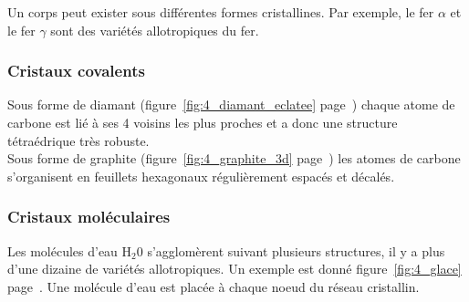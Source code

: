 \begin{rem}
    Un corps peut exister sous différentes formes cristallines. Par exemple,
    le fer $\alpha$ et le fer $\gamma$ sont des variétés allotropiques du
    fer.
\end{rem}

\subsubsection*{Cristaux covalents}
\begin{ex}[Carbone]
    Sous forme de diamant (figure~\ref{fig:4_diamant_eclatee}
    page~\pageref{fig:4_diamant_eclatee}) chaque atome de
    carbone est lié à ses 4 voisins les plus proches et a donc une
    structure tétraédrique très robuste.\\
    Sous forme de graphite (figure~\ref{fig:4_graphite_3d}
    page~\pageref{fig:4_graphite_3d}) les atomes de
    carbone s'organisent en feuillets hexagonaux régulièrement
    espacés et décalés.
\end{ex}


\subsubsection*{Cristaux moléculaires}
\begin{ex}[Eau]
    Les molécules d'eau H$_2$0 s'agglomèrent suivant plusieurs structures,
    il y a plus d'une dizaine de variétés allotropiques.
    Un exemple
    est donné figure~\ref{fig:4_glace} page~\pageref{fig:4_glace}. Une molécule d'eau est placée
    à chaque noeud du réseau cristallin.
\end{ex}
